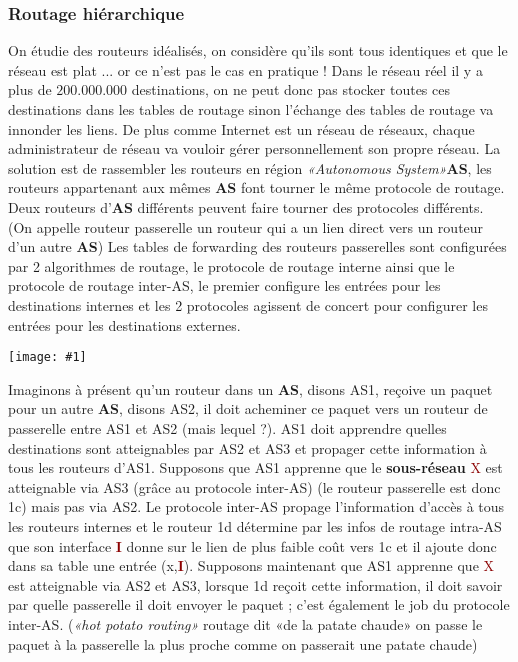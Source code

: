 \documentclass{article}
\newcommand{\dred}[1]{\textcolor{darkred}{\textbf{#1}}}
\newcommand{\red}[1]{\textcolor{darkred}{#1}}
\newcommand{\imgR}[2]{\begin{center}\texttt{[image: \#1]}\end{center}}
\begin{document}
\subsubsection{Routage hiérarchique}

On étudie des routeurs idéalisés, on considère qu'ils sont tous identiques et que le réseau est plat ... or ce 
n'est pas le cas en pratique ! Dans le réseau réel il y a plus de $200.000.000$ destinations, on ne peut donc
pas stocker toutes ces destinations dans les tables de routage sinon l'échange des tables de routage va innonder
les liens. De plus comme Internet est un réseau de réseaux, chaque administrateur de réseau va vouloir gérer
personnellement son propre réseau. La solution est de rassembler les routeurs en région \textit{«Autonomous 
System»}\textbf{AS}, les routeurs appartenant aux mêmes \textbf{AS} font tourner le même protocole de routage.
Deux routeurs d'\textbf{AS} différents peuvent faire tourner des protocoles différents. (On appelle routeur 
passerelle un routeur qui a un lien direct vers un routeur d'un autre \textbf{AS})
Les tables de forwarding des routeurs passerelles sont configurées par 2 algorithmes de routage, le protocole
de routage interne ainsi que le protocole de routage inter-AS, le premier configure les entrées pour les 
destinations internes et les 2 protocoles agissent de concert pour configurer les entrées pour les destinations 
externes.\\
\imgR{CN_091.png}{300}
Imaginons à présent qu'un routeur dans un \textbf{AS}, disons AS1, reçoive un paquet pour un autre \textbf{AS},
disons AS2, il doit acheminer ce paquet vers un routeur de passerelle entre AS1 et AS2 (mais lequel ?). AS1
doit apprendre quelles destinations sont atteignables par AS2 et AS3 et propager cette information à tous les 
routeurs d'AS1. Supposons que AS1 apprenne que le \textbf{sous-réseau} \red{X} est atteignable via AS3 (grâce au 
protocole inter-AS) (le routeur passerelle est donc 1c) mais pas via AS2. Le protocole inter-AS propage 
l'information d'accès à tous les routeurs internes et le routeur 1d détermine par les infos de routage intra-AS 
que son interface \dred{I} donne sur le lien de plus faible coût vers 1c et il ajoute donc dans sa table une 
entrée (x,\dred{I}).
Supposons maintenant que AS1 apprenne que \red{X} est atteignable via AS2 et AS3, lorsque 1d reçoit cette
information, il doit savoir par quelle passerelle il doit envoyer le paquet ; c'est également le job du protocole
inter-AS. (\textit{«hot potato routing»} routage dit «de la patate chaude» on passe le paquet à la passerelle la 
plus proche comme on passerait une patate chaude) \\
\end{document}
